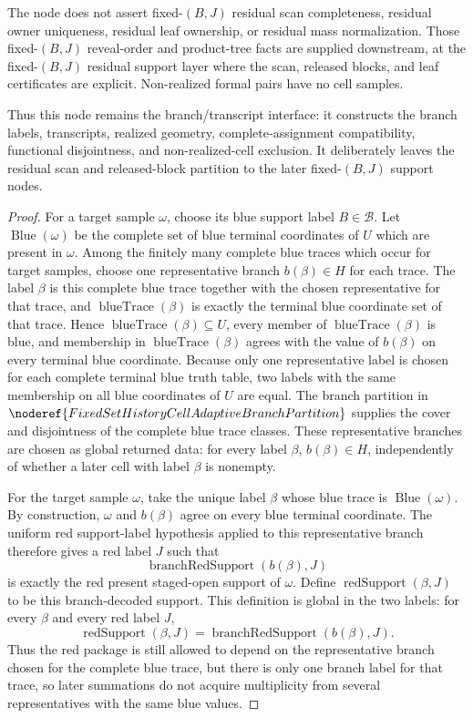 \begin{helper}
The node does not assert fixed-\((B,J)\) residual scan completeness,
residual owner uniqueness, residual leaf ownership, or residual mass
normalization.  Those fixed-\((B,J)\) reveal-order and product-tree facts are
supplied downstream, at the fixed-\((B,J)\) residual support layer where the
scan, released blocks, and leaf certificates are explicit.  Non-realized
formal pairs have no cell samples.

Thus this node remains the branch/transcript interface: it constructs the
branch labels, transcripts, realized geometry, complete-assignment
compatibility, functional disjointness, and non-realized-cell exclusion.  It
deliberately leaves the residual scan and released-block partition to the
later fixed-\((B,J)\) support nodes.
\end{helper}
\begin{proof}
For a target sample \(\omega\), choose its blue support label
\(B\in\mathcal B\).  Let \(\operatorname{Blue}(\omega)\) be the complete set
of blue terminal coordinates of \(U\) which are present in \(\omega\).  Among
the finitely many complete blue traces which occur for target samples, choose
one representative branch \(b(\beta)\in H\) for each trace.  The label
\(\beta\) is this complete blue trace together with the chosen representative
for that trace, and \(\operatorname{blueTrace}(\beta)\) is exactly the
terminal blue coordinate set of that trace.  Hence
\(\operatorname{blueTrace}(\beta)\subseteq U\), every member of
\(\operatorname{blueTrace}(\beta)\) is blue, and membership in
\(\operatorname{blueTrace}(\beta)\) agrees with the value of
\(b(\beta)\) on every terminal blue coordinate.  Because only one
representative label is chosen for each complete terminal blue truth table,
two labels with the same membership on all blue coordinates of \(U\) are
equal.  The branch partition in
\(\noderef{FixedSetHistoryCellAdaptiveBranchPartition}\) supplies the cover
and disjointness of the complete blue trace classes.
These representative branches are chosen as global returned data: for every
label \(\beta\), \(b(\beta)\in H\), independently of whether a later cell
with label \(\beta\) is nonempty.

For the target sample \(\omega\), take the unique label \(\beta\) whose
blue trace is \(\operatorname{Blue}(\omega)\).  By construction,
\(\omega\) and \(b(\beta)\) agree on every blue terminal coordinate.  The
uniform red support-label hypothesis applied to this representative branch
therefore gives a red label \(J\) such that
\[
\operatorname{branchRedSupport}(b(\beta),J)
\]
is exactly the red present staged-open support of \(\omega\).  Define
\(\operatorname{redSupport}(\beta,J)\) to be this branch-decoded support.
This definition is global in the two labels: for every \(\beta\) and every
red label \(J\),
\[
\operatorname{redSupport}(\beta,J)
  =\operatorname{branchRedSupport}(b(\beta),J).
\]
Thus the red package is still allowed to depend on the representative branch
chosen for the complete blue trace, but there is only one branch label for
that trace, so later summations do not acquire multiplicity from several
representatives with the same blue values.


\end{proof}
